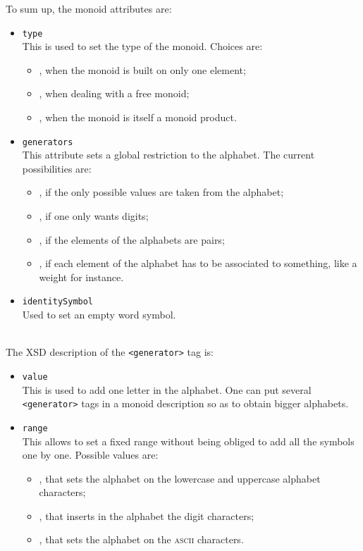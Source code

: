 \documentclass[a4paper]{article}
\newcommand{\xtag}[1]{\texttt{<#1>}}
\newcommand{\xattr}[1]{\texttt{#1}}
\begin{document}
To sum up, the monoid attributes are:
\begin{itemize}
\item \xattr{type}\\
  This is used to set the type of the monoid. Choices are:
  \begin{itemize}
    \item {}, when the monoid is built on only one element;
    \item {}, when dealing with a free monoid;
    \item {}, when the monoid is itself a monoid product.
  \end{itemize}
\item \xattr{generators}\\
  This attribute sets a global restriction to the alphabet. The
  current possibilities are:
  \begin{itemize}
  \item {}, if the only possible values are taken from the
    alphabet;
  \item {}, if one only wants digits;
  \item {}, if the elements of the alphabets are pairs;
  \item {}, if each element of the alphabet has to be associated
    to something, like a weight for instance.
  \end{itemize}
\item \xattr{identitySymbol}\\
  Used to set an empty word symbol.
\end{itemize}
~\\
The XSD description of the \xtag{generator} tag is:
\begin{itemize}
\item \xattr{value}\\
  This is used to add one letter in the alphabet. One can put several
  \xtag{generator} tags in a monoid description so as to obtain bigger
  alphabets.
\item \xattr{range}\\
  This allows to set a fixed range without being obliged to add all
  the symbols one by one. Possible values are:
  \begin{itemize}
  \item {}, that sets the alphabet on the lowercase
    and uppercase alphabet characters;
  \item {}, that inserts in the alphabet the digit characters;
  \item {}, that sets the alphabet on the \textsc{ascii} characters.
  \end{itemize}
\end{itemize}
\end{document}
